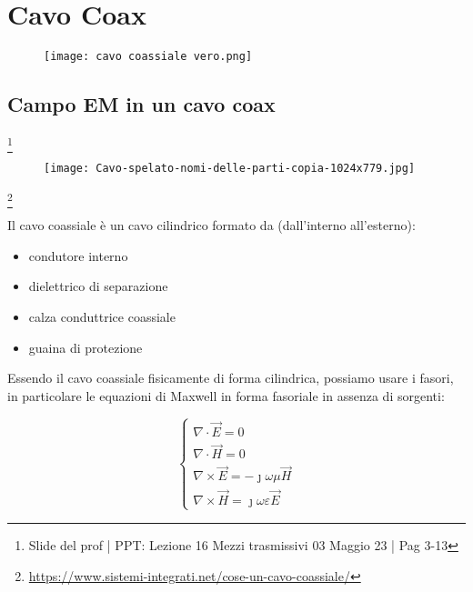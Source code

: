 \chapter{Cavo Coax}

\begin{figure}[h]
    \centering
    \texttt{[image: cavo coassiale vero.png]}
\end{figure} 

\newpage 

\section{Campo EM in un cavo coax} 

\footnote{Slide del prof | PPT: Lezione 16 Mezzi trasmissivi 03 Maggio 23 | Pag 3-13}

\begin{figure}[h]
    \centering
    \texttt{[image: Cavo-spelato-nomi-delle-parti-copia-1024x779.jpg]}
\end{figure} 

\footnote{\url{https://www.sistemi-integrati.net/cose-un-cavo-coassiale/}} 

Il cavo coassiale è un cavo cilindrico formato da (dall'interno all'esterno): 

\begin{itemize}
    \item condutore interno 
    \item dielettrico di separazione 
    \item calza conduttrice coassiale 
    \item guaina di protezione 
\end{itemize}

Essendo il cavo coassiale fisicamente di forma cilindrica, 
possiamo usare i fasori, in particolare le equazioni di Maxwell in forma 
fasoriale in assenza di sorgenti: 

{\Large \begin{equation}
    \begin{cases}
        \nabla \cdot \vec{E} = 0 \\ 
        \nabla \cdot \vec{H} = 0 \\
        \nabla \times \vec{E} = - \jmath \omega \mu \vec{H} \\ 
        \nabla \times \vec{H} = \jmath \omega \varepsilon \vec{E} 
    \end{cases}
\end{equation}}


